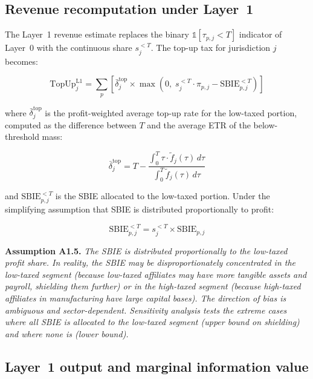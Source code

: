 \documentclass[11pt,a4paper]{article}
\newcommand{\assumption}[2]{\noindent\textbf{Assumption #1.} \textit{#2}\medskip}
\begin{document}
\subsection{Revenue recomputation under Layer~1}\label{sec:layer1_revenue}

The Layer~1 revenue estimate replaces the binary $\mathbb{1}[\tau_{p,j} < T]$ indicator of Layer~0 with the continuous share $s_j^{<T}$. The top-up tax for jurisdiction $j$ becomes:

\begin{equation}\label{eq:topup_layer1}
\text{TopUp}_j^{\text{L1}} = \sum_p \left[\bar{\delta}_j^{\text{top}} \times \max\!\left(0,\; s_j^{<T} \cdot \pi_{p,j} - \text{SBIE}_{p,j}^{<T}\right)\right]
\end{equation}

where $\bar{\delta}_j^{\text{top}}$ is the profit-weighted average top-up rate for the low-taxed portion, computed as the difference between $T$ and the average ETR of the below-threshold mass:

\begin{equation}\label{eq:avg_topup_rate}
\bar{\delta}_j^{\text{top}} = T - \frac{\int_0^{T} \tau \cdot \tilde{f}_j(\tau) \, d\tau}{\int_0^{T} \tilde{f}_j(\tau) \, d\tau}
\end{equation}

and $\text{SBIE}_{p,j}^{<T}$ is the SBIE allocated to the low-taxed portion. Under the simplifying assumption that SBIE is distributed proportionally to profit:

\begin{equation}\label{eq:sbie_lowtax}
\text{SBIE}_{p,j}^{<T} = s_j^{<T} \times \text{SBIE}_{p,j}
\end{equation}

\assumption{A1.5}{The SBIE is distributed proportionally to the low-taxed profit share. In reality, the SBIE may be disproportionately concentrated in the low-taxed segment (because low-taxed affiliates may have more tangible assets and payroll, shielding them further) or in the high-taxed segment (because high-taxed affiliates in manufacturing have large capital bases). The direction of bias is ambiguous and sector-dependent. Sensitivity analysis tests the extreme cases where all SBIE is allocated to the low-taxed segment (upper bound on shielding) and where none is (lower bound).}

\subsection{Layer~1 output and marginal information value}
\end{document}
